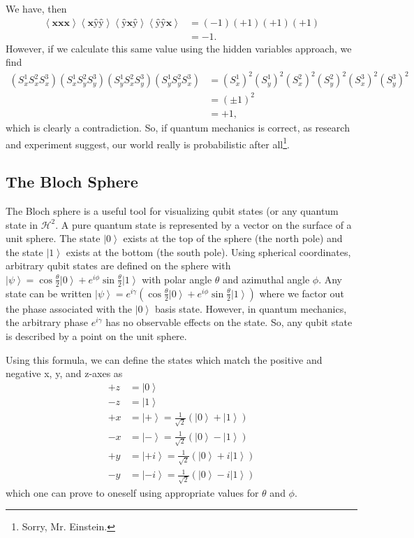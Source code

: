 \documentclass[11pt]{article} %
\newcommand{\ket}[1]{\left|#1\right\rangle}
\begin{document}
We have, then
\begin{align}
    \left<\textbf{\^x}\textbf{\^x}\textbf{\^x}\right>\left<\textbf{\^x}\textbf{\^y}\textbf{\^y}\right>\left<\textbf{\^y}\textbf{\^x}\textbf{\^y}\right>\left<\textbf{\^y}\textbf{\^y}\textbf{\^x}\right> &= (-1)(+1)(+1)(+1)\nonumber\\
    &= -1.
\end{align}
However, if we calculate this same value using the hidden variables approach, we find
\begin{align}
    \left(S^1_xS^2_xS^3_x\right)\left(S^1_xS^2_yS^3_y\right)\left(S^1_yS^2_xS^3_y\right)\left(S^1_yS^2_yS^3_x\right) &= \left(S^1_x\right)^2\left(S^1_y\right)^2\left(S^2_x\right)^2\left(S^2_y\right)^2\left(S^3_x\right)^2\left(S^3_y\right)^2\nonumber\\
    &= (\pm1)^2\nonumber\\
    &= +1,
\end{align}
which is clearly a contradiction. So, if quantum mechanics is correct, as research and experiment suggest, our world really is probabilistic after all\footnote{Sorry, Mr. Einstein.}.

\subsection{The Bloch Sphere}\label{block_sphere}
The Bloch sphere is a useful tool for visualizing qubit states (or any quantum state in $\mathcal{H}^2$. A pure quantum state is represented by a vector on the surface of a unit sphere. The state $\ket{0}$ exists at the top of the sphere (the north pole) and the state $\ket{1}$ exists at the bottom (the south pole). Using spherical coordinates, arbitrary qubit states are defined on the sphere with $\ket{\psi} = \cos\frac{\theta}{2}\ket{0} + e^{i\phi}\sin\frac{\theta}{2}\ket{1}$ with polar angle $\theta$ and azimuthal angle $\phi$. Any state can be written $\ket{\psi} = e^{i\gamma}\left(\cos\frac{\theta}{2}\ket{0} + e^{i\phi}\sin\frac{\theta}{2}\ket{1}\right)$ where we factor out the phase associated with the $\ket{0}$ basis state. However, in quantum mechanics, the arbitrary phase $e^{i\gamma}$ has no observable effects on the state. So, any qubit state is described by a point on the unit sphere.

Using this formula, we can define the states which match the positive and negative x, y, and z-axes as
\begin{align}
    +z &= \ket{0}\nonumber\\
    -z &= \ket{1}\nonumber\\
    +x &= \ket{+} = \frac{1}{\sqrt{2}}\left(\ket{0} + \ket{1}\right)\nonumber\\
    -x &= \ket{-} = \frac{1}{\sqrt{2}}\left(\ket{0} - \ket{1}\right)\nonumber\\
    +y &= \ket{+i} = \frac{1}{\sqrt{2}}\left(\ket{0} + i\ket{1}\right)\nonumber\\
    -y &= \ket{-i} = \frac{1}{\sqrt{2}}\left(\ket{0} - i\ket{1}\right)
\end{align}
which one can prove to oneself using appropriate values for $\theta$ and $\phi$.
\end{document}
